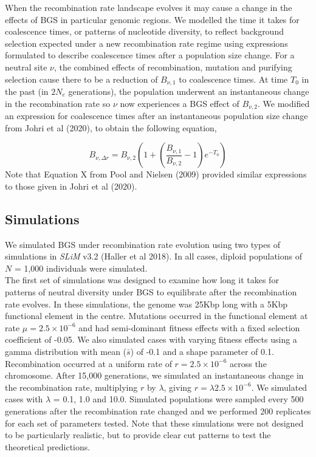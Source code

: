 \documentclass[11pt,twoside,lineno]{GSA_format}
\begin{document}
When the recombination rate landscape evolves it may cause a change in the effects of BGS in particular genomic regions. We modelled the time it takes for coalescence times, or patterns of nucleotide diversity, to reflect background selection expected under a new recombination rate regime using expressions formulated to describe coalescence times after a population size change. For a neutral site $\nu$, the combined effects of recombination, mutation and purifying selection cause there to be a reduction of $B_{\nu,1}$ to coalescence times. At time $T_0$ in the past (in $2N_e$ generations), the population underwent an instantaneous change in the recombination rate so $\nu$ now experiences a BGS effect of $B_{\nu,2}$. We modified an expression for coalescence times after an instantaneous population size change from Johri et al (2020), to obtain the following equation,

\begin{equation}
B_{\nu,\Delta r} = B_{\nu,2} ( 1 + (\frac{B_{\nu,1}}{B_{\nu,2}} - 1)e^{-T_0})
\label{BGS_rec}
\end{equation}
\noindent
Note that Equation X from Pool and Nielsen (2009) provided similar expressions to those given in Johri et al (2020). 


\subsection{Simulations}

We simulated BGS under recombination rate evolution using two types of simulations in \textit{SLiM} v3.2 (Haller et al 2018). In all cases, diploid populations of $N$ = 1,000 individuals were simulated. \\

The first set of simulations was designed to examine how long it takes for patterns of neutral diversity under BGS to equilibrate after the recombination rate evolves. In these simulations, the genome was 25Kbp long with a 5Kbp functional element in the centre. Mutations occurred in the functional element at rate $\mu = 2.5\times10^{-6}$ and had semi-dominant fitness effects with a fixed selection coefficient of -0.05. We also simulated cases with varying fitness effects using a gamma distribution with mean ($\bar{s}$) of -0.1 and a shape parameter of 0.1. Recombination occurred at a uniform rate of $r = 2.5\times10^{-6}$ across the chromosome. After 15,000 generations, we simulated an instantaneous change in the recombination rate, multiplying $r$ by $\lambda$, giving $r = \lambda2.5\times10^{-6}$. We simulated cases with $\lambda$ = 0.1, 1.0 and 10.0. Simulated populations were sampled every 500 generations after the recombination rate changed and we performed 200 replicates for each set of parameters tested. Note that these simulations were not designed to be particularly realistic, but to provide clear cut patterns to test the theoretical predictions. \\
\end{document}
